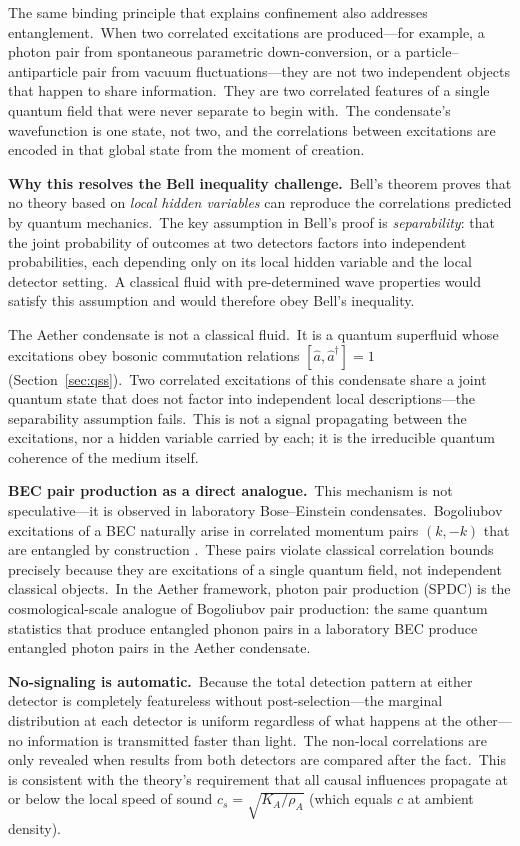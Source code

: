﻿\documentclass[12pt,letterpaper]{article}
\newcommand{\rhoa}{\rho_{\!A}}
\newcommand{\Ka}{K_{\!A}}
\begin{document}
The same binding principle that explains confinement also addresses entanglement.\
When two correlated excitations are produced---for example, a photon pair from
spontaneous parametric down-conversion, or a particle--antiparticle pair from
vacuum fluctuations---they are not two independent objects that happen to share
information.\ They are two correlated features of a single quantum field that were
never separate to begin with.\ The condensate's wavefunction is one state, not two,
and the correlations between excitations are encoded in that global state from the
moment of creation.

\textbf{Why this resolves the Bell inequality challenge.}\ Bell's theorem
\cite{bell1964} proves that no theory based on \emph{local hidden variables} can
reproduce the correlations predicted by quantum mechanics.\ The key assumption in
Bell's proof is \emph{separability}: that the joint probability of outcomes at two
detectors factors into independent probabilities, each depending only on its local
hidden variable and the local detector setting.\ A classical fluid with
pre-determined wave properties would satisfy this assumption and would therefore
obey Bell's inequality.

The Aether condensate is not a classical fluid.\ It is a quantum superfluid whose
excitations obey bosonic commutation relations $[\hat{a}, \hat{a}^\dagger] = 1$
(Section~\ref{sec:qss}).\ Two correlated excitations of this condensate share a
joint quantum state that does not factor into independent local descriptions---the
separability assumption fails.\ This is not a signal propagating between the
excitations, nor a hidden variable carried by each; it is the irreducible quantum
coherence of the medium itself.

\textbf{BEC pair production as a direct analogue.}\ This mechanism is not
speculative---it is observed in laboratory Bose--Einstein condensates.\
Bogoliubov excitations of a BEC naturally arise in correlated momentum pairs
$(k, -k)$ that are entangled by construction \cite{steinhauer2016}.\ These pairs
violate classical correlation bounds precisely because they are excitations of
a single quantum field, not independent classical objects.\ In the Aether
framework, photon pair production (SPDC) is the cosmological-scale analogue of
Bogoliubov pair production: the same quantum statistics that produce entangled
phonon pairs in a laboratory BEC produce entangled photon pairs in the Aether
condensate.

\textbf{No-signaling is automatic.}\ Because the total detection pattern at either
detector is completely featureless without post-selection---the marginal
distribution at each detector is uniform regardless of what happens at the
other---no information is transmitted faster than light.\ The non-local
correlations are only revealed when results from both detectors are compared after
the fact.\ This is consistent with the theory's requirement that all causal
influences propagate at or below the local speed of sound $c_s = \sqrt{\Ka/\rhoa}$ (which equals $c$ at ambient density).
\end{document}
